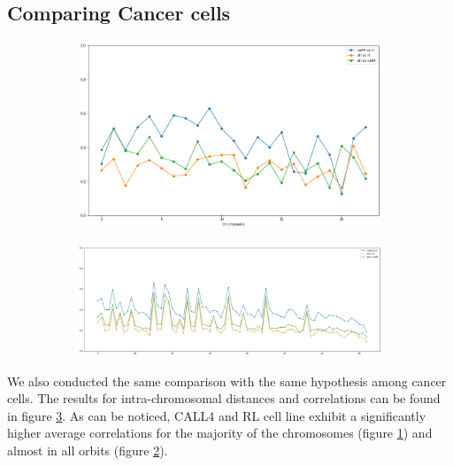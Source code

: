 \documentclass[a4,center,fleqn]{NAR}
\begin{document}
\subsection{Comparing Cancer cells}
\begin{figure}[t]
    \centering
    \begin{subfigure}[b]{\textwidth}
        \includegraphics[width=\textwidth]{figures/orbit-distances_intra_cancer.png}
        \caption{}
        \label{fig:orbit_distances_intra_cancer}
    \end{subfigure}
    \begin{subfigure}[b]{\textwidth}
        \includegraphics[width=\textwidth]{figures/orbits_correlations_intra_cancer.png}
        \caption{}
        \label{fig:orbits_correlations_intra_cancer}
    \end{subfigure}
    \caption{}
    \label{fig:orbits_cancer_intra}
\end{figure}

We also conducted the same comparison with the same hypothesis among cancer cells.
The results for intra-chromosomal distances and correlations can be found in
figure \ref{fig:orbits_cancer_intra}. As can be noticed, CALL4 and RL cell
line exhibit a significantly higher average correlations for the majority of
the chromosomes (figure \ref{fig:orbit_distances_intra_cancer}) and almost in
all orbits (figure \ref{fig:orbits_correlations_intra_cancer}).
\end{document}
